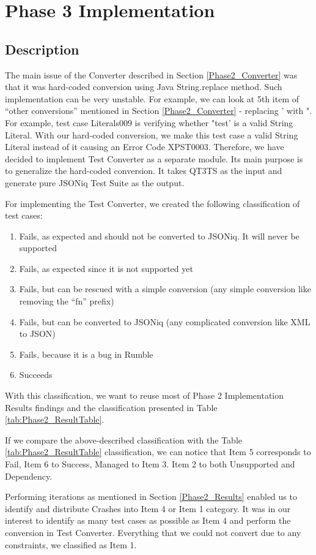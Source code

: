 \section{Phase 3 Implementation}
\subsection{Description}
\label{Phase3_Description}
The main issue of the Converter described in Section \ref{Phase2_Converter} was that it was hard-coded conversion using Java String.replace method. Such implementation can be very unstable. For example, we can look at 5th item of ``other conversions'' mentioned in Section \ref{Phase2_Converter} - replacing ' with ". For example, test case Literals009 is verifying whether "test' is a valid String Literal. With our hard-coded conversion, we make this test case a valid String Literal instead of it causing an Error Code XPST0003. Therefore, we have decided to implement Test Converter as a separate module. Its main purpose is to generalize the hard-coded conversion. It takes QT3TS as the input and generate pure JSONiq Test Suite as the output.

For implementing the Test Converter, we created the following classification of test cases:
\begin{enumerate}
	\item Fails, as expected and should not be converted to JSONiq. It will never be supported
	\item Fails, as expected since it is not supported yet
	\item Fails, but can be rescued with a simple conversion (any simple conversion like removing the ``fn'' prefix)
	\item Fails, but can be converted to JSONiq (any complicated conversion like XML to JSON)
	\item Fails, because it is a bug in Rumble
	\item Succeeds
\end{enumerate}

With this classification, we want to reuse most of Phase 2 Implementation Results findings and the classification presented in Table \ref{tab:Phase2_ResultTable}.

If we compare the above-described classification with the Table \ref{tab:Phase2_ResultTable} classification, we can notice that Item 5 corresponds to Fail, Item 6 to Success, Managed to Item 3. Item 2 to both Unsupported and Dependency.

Performing iterations as mentioned in Section \ref{Phase2_Results} enabled us to identify and distribute Crashes into Item 4 or Item 1 category. It was in our interest to identify as many test cases as possible as Item 4 and perform the conversion in Test Converter. Everything that we could not convert due to any constraints, we classified as Item 1. 


